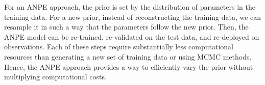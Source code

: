 For an ANPE approach, the prior is set by the distribution of parameters in the
training data. 
For a new prior, instead of reconstructing the training data, we can resample
it in such a way that the parameters follow the new prior.
Then, the ANPE model can be re-trained, re-validated on the test data, and
re-deployed on observations.
Each of these steps require substantially less computational resources than
generating a new set of training data or using MCMC methods. 
Hence, the ANPE approach provides a way to efficiently vary the prior without
multiplying computational costs.
